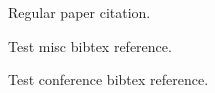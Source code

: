 \documentclass[twoside,twocolumn,9pt]{article}
\begin{document}
Regular paper citation.\cite{Gong2017}

Test misc bibtex reference.\cite{keynote2017}

Test conference bibtex reference.\cite{nordin2017}


 
\end{document}
